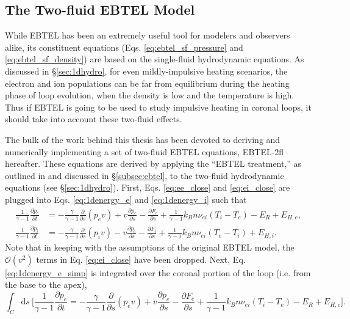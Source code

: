 \subsection{The Two-fluid EBTEL Model}
\label{subsec:two_fluid_ebtel}
%
\par While EBTEL has been an extremely useful tool for modelers and observers alike, its constituent equations (Eqs. \ref{eq:ebtel_sf_pressure} and \ref{eq:ebtel_sf_density}) are based on the single-fluid hydrodynamic equations. As discussed in \S\ref{sec:1dhydro}, for even mildly-impulsive heating scenarios, the electron and ion populations can be far from equilibrium during the heating phase of loop evolution, when the density is low and the temperature is high. Thus if EBTEL is going to be used to study impulsive heating in coronal loops, it should take into account these two-fluid effects.
%
\par The bulk of the work behind this thesis has been devoted to deriving and numerically implementing a set of two-fluid EBTEL equations, EBTEL-2fl hereafter. These equations are derived by applying the ``EBTEL treatment,'' as outlined in \citet{klimchuk_highly_2008} and discussed in \S\ref{subsec:ebtel}, to the two-fluid hydrodynamic equations (see \S\ref{sec:1dhydro}). First, Eqs. \ref{eq:ee_close} and \ref{eq:ei_close} are plugged into Eqs. \ref{eq:1denergy_e} and \ref{eq:1denergy_i} such that
\begin{align}
	\frac{1}{\gamma - 1}\frac{\partial p_e}{\partial t} &= -\frac{\gamma}{\gamma - 1}\frac{\partial}{\partial s}(p_ev)+v\frac{\partial p_e}{\partial s} - \frac{\partial F_{e}}{\partial s} + \frac{1}{\gamma - 1}k_Bn\nu_{ei}(T_i-T_e) -E_R+E_{H,e}, \label{eq:1denergy_e_simp} \\[0.5em]
	\frac{1}{\gamma - 1}\frac{\partial p_i}{\partial t} &= -\frac{\gamma}{\gamma - 1}\frac{\partial }{\partial s}(p_iv) -v\frac{\partial p_e}{\partial s} - \frac{\partial F_{i}}{\partial s} + \frac{1}{\gamma - 1}k_Bn\nu_{ei}(T_e-T_i) + E_{H,i}. \label{eq:1denergy_i_simp}
\end{align}
Note that in keeping with the assumptions of the original EBTEL model, the $\mathcal{O}(v^2)$ terms in Eq. \ref{eq:ei_close} have been dropped. Next, Eq. \ref{eq:1denergy_e_simp} is integrated over the coronal portion of the loop (i.e. from the base to the apex),
\begin{equation}
	\label{eq:energy_e_int}
	\int_C\mathrm{d}s~\Big[\frac{1}{\gamma - 1}\frac{\partial p_e}{\partial t} = -\frac{\gamma}{\gamma - 1}\frac{\partial}{\partial s}(p_ev)+v\frac{\partial p_e}{\partial s} - \frac{\partial F_{e}}{\partial s} + \frac{1}{\gamma - 1}k_Bn\nu_{ei}(T_i-T_e) -E_R+E_{H,e}\Big].
\end{equation}
